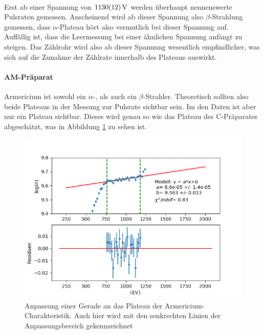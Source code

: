 \documentclass[12pt,a4paper]{article}
\begin{document}
\\
Erst ab einer Spannung von $\SI{1130\pm 12}{V}$ werden überhaupt nennenswerte Pulsraten gemessen. Anscheinend wird ab dieser Spannung also $\beta$-Strahlung gemessen, dass $\alpha$-Plateau hört also vermutlich bei dieser Spannung auf.\\
Auffällig ist, dass die Leermessung bei einer ähnlichen Spannung anfängt zu steigen. Das Zählrohr wird also ab dieser Spannung wesentlich empfindlicher, was sich auf die Zunahme der Zählrate innerhalb des Plateaus auswirkt.

\paragraph{AM-Präparat}
Armericium ist sowohl ein $\alpha$-, als auch ein $\beta$-Strahler. Theoretisch sollten also beide Plateaus in der Messung zur Pulsrate sichtbar sein. Im den Daten ist aber nur ein Plateau sichtbar. Dieses wird genau so wie das Plateau des C-Präparates abgeschätzt, was in Abbildung \ref{fig:AMPlateau} zu sehen ist.

\begin{figure}
\centering
\includegraphics[scale=0.8]{Bilder/Prop/Am_plateau.PNG}
\caption{Anpassung einer Gerade an das Plateau der Armericium-Charakteristik. Auch hier wird mit den senkrechten Linien der Anpassungsbereich gekennzeichnet}
\label{fig:AMPlateau}
\end{figure}
\end{document}

